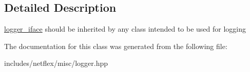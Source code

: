 \subsection{Detailed Description}
\hyperlink{classnetflex_1_1logger__iface}{logger\+\_\+iface} should be inherited by any class intended to be used for logging 

The documentation for this class was generated from the following file\+:\begin{DoxyCompactItemize}
\item 
includes/netflex/misc/logger.\+hpp\end{DoxyCompactItemize}
